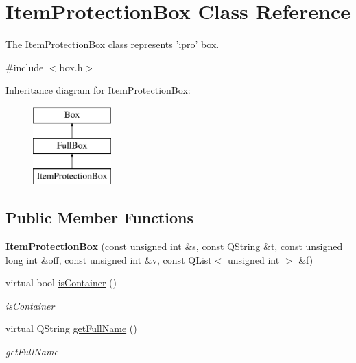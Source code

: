 \hypertarget{class_item_protection_box}{\section{Item\-Protection\-Box Class Reference}
\label{class_item_protection_box}
}


The \hyperlink{class_item_protection_box}{Item\-Protection\-Box} class represents 'ipro' box.  




{\ttfamily \#include $<$box.\-h$>$}

Inheritance diagram for Item\-Protection\-Box\-:\begin{figure}[H]
\begin{center}
\leavevmode
\includegraphics[height=3.000000cm]{class_item_protection_box}
\end{center}
\end{figure}
\subsection*{Public Member Functions}
\begin{DoxyCompactItemize}
\item 
\hypertarget{class_item_protection_box_ac9688520f3d4da689467b2e72df74b08}{{\bfseries Item\-Protection\-Box} (const unsigned int \&s, const Q\-String \&t, const unsigned long int \&off, const unsigned int \&v, const Q\-List$<$ unsigned int $>$ \&f)}\label{class_item_protection_box_ac9688520f3d4da689467b2e72df74b08}

\item 
virtual bool \hyperlink{class_item_protection_box_a3d1db2ceacc95601edf25808f3bcf4c3}{is\-Container} ()
\begin{DoxyCompactList}\small\item\em is\-Container \end{DoxyCompactList}\item 
virtual Q\-String \hyperlink{class_item_protection_box_a282908379f31aeaacb0eac073050b132}{get\-Full\-Name} ()
\begin{DoxyCompactList}\small\item\em get\-Full\-Name \end{DoxyCompactList}\end{DoxyCompactItemize}
